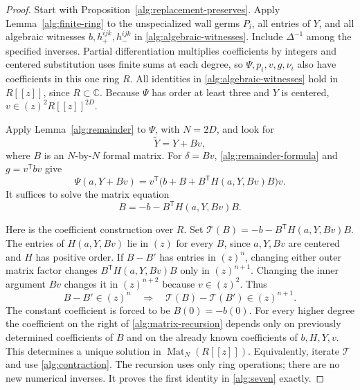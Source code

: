 \begin{proof}
Start with Proposition~\ref{alg:replacement-preserves}. Apply
Lemma~\ref{alg:finite-ring} to the unspecialized wall germs $P_i$, all
entries of $Y$, and all algebraic witnesses $b,h_+^{ijk},h_-^{ijk}$ in
\eqref{alg:algebraic-witnesses}. Include $\Delta^{-1}$ among the
specified inverses. Partial differentiation multiplies coefficients
by integers and centered substitution uses finite sums at each degree,
so $\Psi,p_i,v,g,\nu_i$ also have coefficients in this one ring $R$.
All identities in \eqref{alg:algebraic-witnesses} hold in $R[[z]]$,
since $R\subset\mathbb C$. Because $\Psi$ has order at least three and
$Y$ is centered, $v\in(z)^2R[[z]]^{2D}$.

Apply Lemma~\ref{alg:remainder} to $\Psi$, with $N=2D$, and look for
\[
 \widetilde Y=Y+Bv,
\]
where $B$ is an $N$-by-$N$ formal matrix. For $\delta=Bv$,
\eqref{alg:remainder-formula} and $g=v^{\mathsf T}bv$ give
\[
 \Psi(a,Y+Bv)
 =v^{\mathsf T}\bigl(b+B+B^{\mathsf T}H(a,Y,Bv)B\bigr)v.
\]
It suffices to solve the matrix equation
\begin{equation}
 B=-b-B^{\mathsf T}H(a,Y,Bv)B.
 \label{alg:matrix-recursion}
\end{equation}

Here is the coefficient construction over $R$.
Set $\mathcal T(B)=-b-B^{\mathsf T}H(a,Y,Bv)B$.
The entries of $H(a,Y,Bv)$ lie in $(z)$ for every $B$, since $a,Y,Bv$
are centered and $H$ has positive order. If $B-B'$ has entries in
$(z)^n$, changing either outer matrix factor changes
$B^{\mathsf T}H(a,Y,Bv)B$ only in $(z)^{n+1}$.
Changing the inner argument $Bv$ changes it in $(z)^{n+2}$ because
$v\in(z)^2$. Thus
\begin{equation}
 B-B'\in(z)^n\quad\Longrightarrow\quad
 \mathcal T(B)-\mathcal T(B')\in(z)^{n+1}.
 \label{alg:contraction}
\end{equation}
The constant coefficient is forced to be $B(0)=-b(0)$.
For every higher degree the coefficient on the right of
\eqref{alg:matrix-recursion} depends only on previously determined
coefficients of $B$ and on the already known coefficients of $b,H,Y,v$.
This determines a unique solution in $\operatorname{Mat}_N(R[[z]])$.
Equivalently, iterate $\mathcal T$ and use
\eqref{alg:contraction}. The recursion uses only ring operations;
there are no new numerical inverses. It proves the first identity in
\eqref{alg:seven} exactly.


\end{proof}
